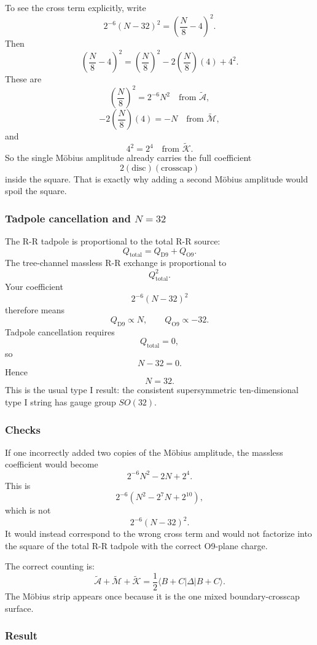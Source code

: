 \documentclass[
  10pt,
  a4paper,
  openany]{book}
\begin{document}
To see the cross term explicitly, write \[
2^{-6}(N-32)^2
=
\left(\frac{N}{8}-4\right)^2.
\] Then \[
\left(\frac{N}{8}-4\right)^2
=
\left(\frac{N}{8}\right)^2
-
2\left(\frac{N}{8}\right)(4)
+
4^2.
\] These are \[
\left(\frac{N}{8}\right)^2
=
2^{-6}N^2
\quad
\text{from } \tilde{\mathcal A},
\] \[
-
2\left(\frac{N}{8}\right)(4)
=
-N
\quad
\text{from } \tilde{\mathcal M},
\] and \[
4^2
=
2^4
\quad
\text{from } \tilde{\mathcal K}.
\] So the single Möbius amplitude already carries the full coefficient
\[
2(\text{disc})(\text{crosscap})
\] inside the square. That is exactly why adding a second Möbius
amplitude would spoil the square.

\subsubsection{\texorpdfstring{Tadpole cancellation and
\(N=32\)}{Tadpole cancellation and N=32}}\label{tadpole-cancellation-and-n32}

The R-R tadpole is proportional to the total R-R source: \[
Q_{\mathrm{total}}
=
Q_{\mathrm{D9}}+Q_{\mathrm{O9}}.
\] The tree-channel massless R-R exchange is proportional to \[
Q_{\mathrm{total}}^2.
\] Your coefficient \[
2^{-6}(N-32)^2
\] therefore means \[
Q_{\mathrm{D9}}\propto N,
\qquad
Q_{\mathrm{O9}}\propto -32.
\] Tadpole cancellation requires \[
Q_{\mathrm{total}}=0,
\] so \[
N-32=0.
\] Hence \[
\boxed{
N=32.
}
\] This is the usual type I result: the consistent supersymmetric
ten-dimensional type I string has gauge group \(SO(32)\).

\subsubsection{Checks}\label{checks-6}

If one incorrectly added two copies of the Möbius amplitude, the
massless coefficient would become \[
2^{-6}N^2-2N+2^4.
\] This is \[
2^{-6}
\left(
N^2-2^7N+2^{10}
\right),
\] which is not \[
2^{-6}(N-32)^2.
\] It would instead correspond to the wrong cross term and would not
factorize into the square of the total R-R tadpole with the correct
O9-plane charge.

The correct counting is: \[
\boxed{
\tilde{\mathcal A}+\tilde{\mathcal M}+\tilde{\mathcal K}
=
\frac{1}{2}\langle B+C|\Delta|B+C\rangle.
}
\] The Möbius strip appears once because it is the one mixed
boundary-crosscap surface.

\subsubsection{Result}\label{result-10}
\end{document}
